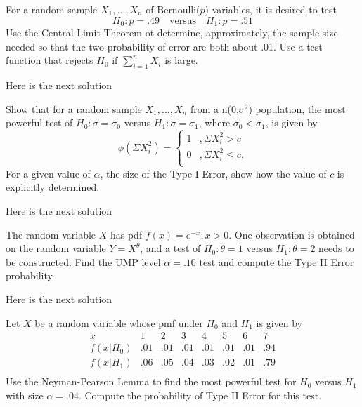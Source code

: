 \documentclass[12pt,letterpaper]{exam}
\begin{document}
\begin{questions}
\renewcommand{\thequestion}{14}
	\question For a random sample $X_1, ..., X_n$ of Bernoulli($p$) variables, it is desired to test $$H_0: p = .49 \quad\text{versus}\quad H_1: p = .51$$
	Use the Central Limit Theorem ot determine, approximately, the sample size needed so that the two probability of error are both about .01. Use a test function that rejects $H_0$ if $\sum_{i=1}^{n} X_i$ is large.
	\begin{solution}
		Here is the next solution
	\end{solution}

\renewcommand{\thequestion}{15}
	\question Show that for a random sample $X_1, ..., X_n$ from a n(0,$\sigma^2$) population, the most powerful test of $H_0: \sigma = \sigma_0$ versus $H_1: \sigma = \sigma_1$, where $\sigma_0 < \sigma_1$, is given by
	$$\phi\left(\Sigma X_i^2\right) =
	\begin{cases}
		1 &, \Sigma X_i^2 > c \\
		0 &, \Sigma X_i^2 \le c. \\
	\end{cases}	$$
	For a given value of $\alpha$, the size of the Type I Error, show how the value of $c$ is explicitly determined.
	\begin{solution}
		Here is the next solution
	\end{solution}

\renewcommand{\thequestion}{19}
	\question The random variable $X$ has pdf $f(x) = e^{-x}, x> 0$. One observation is obtained on the random variable $Y = X^\theta$, and a test of $H_0: \theta = 1$ versus $H_1: \theta = 2$ needs to be constructed. Find the UMP level $\alpha = .10$ test and compute the Type II Error probability.

	\begin{solution}
		Here is the next solution
	\end{solution}

\renewcommand{\thequestion}{20}
	\question Let $X$ be a random variable whose pmf under $H_0$ and $H_1$ is given by
	$$
	\begin{array}{cccccccc}
		x & 1 & 2 & 3 & 4 & 5 & 6 & 7 \\ \hline
		f(x|H_0) & .01 & .01 & .01 & .01 & .01 & .01 & .94 \\
		f(x|H_1) & .06 & .05 & .04 & .03 & .02 & .01 & .79 \\
	\end{array}
	$$
	Use the Neyman-Pearson Lemma to find the most powerful test for $H_0$ versus $H_1$ with size $\alpha = .04$. Compute the probability of Type II Error for this test.


\end{questions}
\end{document}
